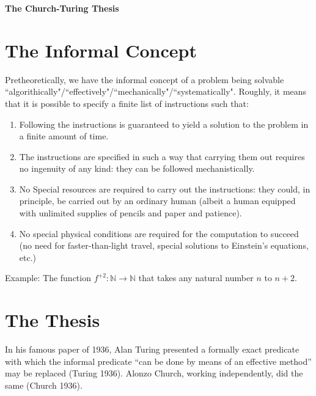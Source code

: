 \documentclass[11pt]{article}
\theoremstyle{definition}
\begin{document}




\begin{center}
{\LARGE \bf The Church-Turing Thesis}
\end{center}

\smallskip

\section{The Informal Concept}

Pretheoretically, we have the informal concept of a problem being solvable ``algorithically"/``effectively"/``mechanically"/``systematically". Roughly, it means that it is possible to specify a finite list of instructions such that:

\begin{enumerate}
\item Following the instructions is guaranteed to yield a solution to the problem in a finite amount of time.
\item The instructions are specified in such a way that carrying them out requires no ingenuity of any kind: they can be followed mechanistically.
\item No Special resources are required to carry out the instructions: they could, in principle, be carried out by an ordinary human (albeit a human equipped with unlimited supplies of pencils and paper and patience).
\item No special physical conditions are required for the computation to succeed (no need for faster-than-light travel, special solutions to Einstein's equations, etc.)
\end{enumerate}

Example: The function $f^{+2}: \mathbb{N} \rightarrow \mathbb{N}$ that takes any natural number $n$ to $n+2$.

\section{The Thesis}

In his famous paper of 1936, Alan Turing presented a formally exact predicate with which the informal predicate ``can be done by means of an effective method” may be replaced (Turing 1936). Alonzo Church, working independently, did the same (Church 1936). \\
\end{document}

